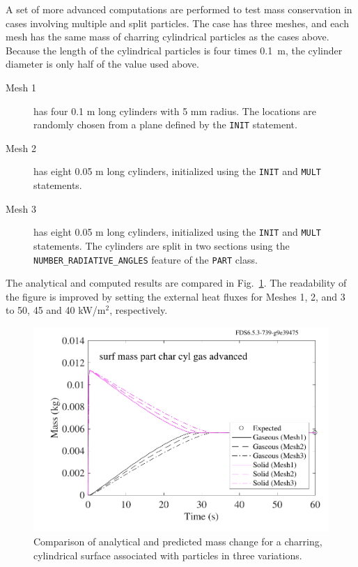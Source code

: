 \documentclass[11pt]{book}
\newcommand{\ct}{\tt\small}
\begin{document}
A set of more advanced computations are performed to test mass conservation in cases involving multiple and split particles.
The case has three meshes, and each mesh has the same mass of charring cylindrical particles as the cases above.
Because the length of the cylindrical particles is four times 0.1~m, the cylinder diameter is only half of the value used above.
\begin{description}
\item[Mesh 1] has four 0.1 m long cylinders with 5 mm radius. The locations are randomly chosen from a plane defined by the {\ct INIT} statement.
\item[Mesh 2] has eight 0.05 m long cylinders, initialized using the {\ct INIT} and {\ct MULT} statements.
\item[Mesh 3] has eight 0.05 m long cylinders, initialized using the {\ct INIT} and {\ct MULT} statements. The cylinders are split in two sections using the
{\ct NUMBER\_RADIATIVE\_ANGLES} feature of the {\ct PART} class.
\end{description}
The analytical and computed results are compared in Fig.~\ref{surf_mass_part_char_advanced}.
The readability of the figure is improved by setting the external heat fluxes for Meshes 1, 2, and 3 to 50, 45 and 40 kW/m$^2$, respectively.
\begin{figure}[ht]
\begin{center}
\includegraphics[width=5.0in]{SCRIPT_FIGURES/surf_mass_part_char_cyl_gas_advanced}
\end{center}
\caption[The {\ct surf\_mass\_part\_char\_cyl\_gas\_advanced} test cases.]{Comparison of analytical and predicted mass change for a charring, cylindrical surface
associated with particles in three variations.}
\label{surf_mass_part_char_advanced}
\end{figure}
\end{document}
